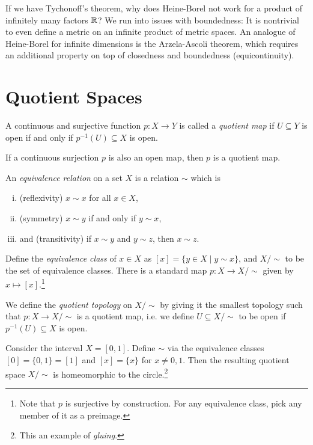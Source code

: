 \begin{remark}
  If we have Tychonoff's theorem, why does Heine-Borel
  not work for a product of infinitely many factors
  $\mathbb{R}$? We run into issues with boundedness: It is
  nontrivial to even define a metric on an infinite
  product of metric spaces. An analogue of
  Heine-Borel for infinite dimensions is the
  Arzela-Ascoli theorem, which requires an additional
  property on top of closedness and boundedness
  (equicontinuity).
\end{remark}

\section{Quotient Spaces}

\begin{definition}
  A continuous and surjective function
  $p : X \to Y$ is called
  a \emph{quotient map} if $U \subseteq Y$ is
  open if and only if $p^{-1}(U) \subseteq X$ is open.
\end{definition}

\begin{example}
  If a continuous surjection $p$ is also an open
  map, then $p$ is a quotient map.
\end{example}

\begin{definition}
  An \emph{equivalence relation} on a set $X$ is a
  relation $\sim$ which is
  \begin{enumerate}[(i)]
    \item (reflexivity) $x \sim x$ for all $x \in X$,
    \item (symmetry) $x \sim y$ if and only if
      $y \sim x$,
    \item and (transitivity) if $x \sim y$ and
      $y \sim z$, then $x \sim z$.
  \end{enumerate}
  Define the \emph{equivalence class} of $x \in X$
  as $[x] = \{y \in X \mid y \sim x\}$, and
  $X / {\sim}$ to be the set of equivalence classes.
  There is a standard map $p : X \to X / {\sim}$
  given by $x \mapsto [x]$.\footnote{Note that $p$ is surjective by construction. For any equivalence class, pick any member of it as a preimage.}
\end{definition}

\begin{definition}
  We define the \emph{quotient topology} on $X / {\sim}$ by giving it the smallest topology such that
  $p : X \to X / {\sim}$ is a quotient map, i.e.
  we define $U \subseteq X / {\sim}$ to be open if
  $p^{-1}(U) \subseteq X$ is open.
\end{definition}

\begin{example}
  Consider the interval $X = [0, 1]$. Define $\sim$
  via the
  equivalence classes $[0] = \{0, 1\} = [1]$ and
  $[x] = \{x\}$ for $x \ne 0, 1$. Then the resulting
  quotient space $X / {\sim}$ is homeomorphic to
  the circle.\footnote{This an example of \emph{gluing}.}
\end{example}
